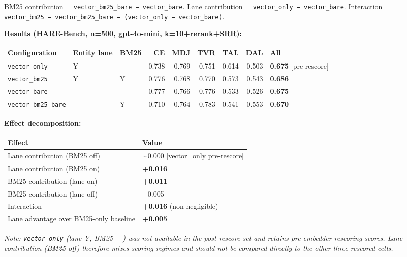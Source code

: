 BM25 contribution = \texttt{vector\_bm25\_bare\ −\ vector\_bare}. Lane contribution = \texttt{vector\_only\ −\ vector\_bare}. Interaction = \texttt{vector\_bm25\ −\ vector\_bm25\_bare\ −\ (vector\_only\ −\ vector\_bare)}.

\textbf{Results (HARE-Bench, n=500, gpt-4o-mini, k=10+rerank+SRR):}

\begin{small}
\setlength{\tabcolsep}{4pt}
\begin{longtable}{p{1.6in}p{0.55in}p{0.55in}rrrrrl}
\toprule
\textbf{Configuration} & \textbf{Entity lane} & \textbf{BM25} & \textbf{CE} & \textbf{MDJ} & \textbf{TVR} & \textbf{TAL} & \textbf{DAL} & \textbf{All} \\
\midrule
\endhead
\texttt{vector\_only} & Y & — & 0.738 & 0.769 & 0.751 & 0.614 & 0.503 & \textbf{0.675} [pre-rescore] \\
\texttt{vector\_bm25} & Y & Y & 0.776 & 0.768 & 0.770 & 0.573 & 0.543 & \textbf{0.686} \\
\texttt{vector\_bare} & — & — & 0.777 & 0.766 & 0.776 & 0.533 & 0.526 & \textbf{0.675} \\
\texttt{vector\_bm25\_bare} & — & Y & 0.710 & 0.764 & 0.783 & 0.541 & 0.553 & \textbf{0.670} \\
\bottomrule
\end{longtable}
\end{small}

\textbf{Effect decomposition:}

\begin{small}
\setlength{\tabcolsep}{4pt}
\begin{longtable}{p{3.0in}p{3.0in}}
\toprule
\textbf{Effect} & \textbf{Value} \\
\midrule
\endhead
Lane contribution (BM25 off) & $\sim$0.000 [vector\_only pre-rescore] \\
Lane contribution (BM25 on) & \textbf{+0.016} \\
BM25 contribution (lane on) & \textbf{+0.011} \\
BM25 contribution (lane off) & $-$0.005 \\
Interaction & \textbf{+0.016} (non-negligible) \\
Lane advantage over BM25-only baseline & \textbf{+0.005} \\
\bottomrule
\end{longtable}
\end{small}

\emph{Note: \texttt{vector\_only} (lane Y, BM25 ---) was not available in the post-rescore set and retains pre-embedder-rescoring scores. Lane contribution (BM25 off) therefore mixes scoring regimes and should not be compared directly to the other three rescored cells.}

